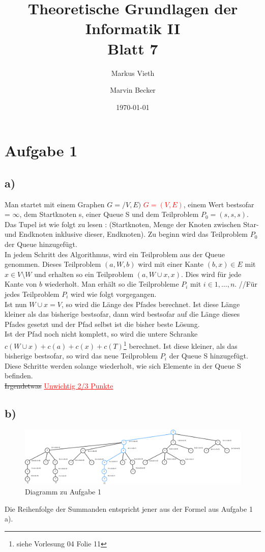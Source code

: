 \documentclass[a4paper,11pt,twoside]{article}
\title{Theoretische Grundlagen der Informatik II\\ Blatt 7}
\author{Markus Vieth \and Marvin Becker}
\date{\today}
\newcommand{\korr}[2]{\sout{#1} \textcolor{red}{\underline{#2}}}
\begin{document}
\maketitle
\cleardoublepage
\pagestyle{myheadings}

\section*{Aufgabe 1}
\subsection*{a)}
Man startet mit einem Graphen \korr{$G=/V,E)$}{$G=(V,E)$}, einem Wert \textrm{bestsofar} = $\infty$, dem Startknoten s, einer Queue S und dem Teilproblem $P_0 = (s,{s},s)$. Das Tupel ist wie folgt zu lesen : (Startknoten, Menge der Knoten zwischen Star- und Endknoten inklusive dieser, Endknoten).
Zu beginn wird das Teilproblem $P_0$ der Queue hinzugefügt.\\
In jedem Schritt des Algorithmus, wird ein Teilproblem aus der Queue genommen. Dieses Teilproblem $(a, W, b)$ wird mit einer Kante $(b, x)\in E $ mit $x\in V\setminus W$ und erhalten so ein Teilproblem $(a, W \cup {x}, x)$. Dies wird für jede Kante von $b$ wiederholt. Man erhält so die Teilprobleme $P_i$ mit $i\in {1,\ldots,n}$.
//Für jedes Teilproblem $P_i$ wird wie folgt vorgegangen.
\\Ist nun $W \cup {x} = V$, so wird die Länge des Pfades berechnet. Ist diese Länge kleiner als das bisherige \textrm{bestsofar}, dann wird \textrm{bestsofar} auf die Länge dieses Pfades gesetzt und der Pfad selbst ist die bisher beste Lösung.
\\Ist der Pfad noch nicht komplett, so wird die untere Schranke $c(W \cup {x})+c(a)+c(x)+c(T)$\footnote{siehe Vorlesung 04 Folie 11} berechnet. Ist diese kleiner, als das bisherige \textrm{bestsofar}, so wird das neue Teilproblem $P_i$ der Queue S hinzugefügt.\\
Diese Schritte werden solange wiederholt, wie sich Elemente in der Queue S befinden.\\
\korr{Irgendetwas}{Unwichtig 2/3 Punkte}
\subsection*{b)}
\begin{figure}[h]
	\hspace{-60pt}
\includegraphics[width=1.2\linewidth]{Baum}
\caption{Diagramm zu Aufgabe 1}
\label{fig:Baum}
\end{figure}
Die Reihenfolge der Summanden entspricht jener aus der Formel aus Aufgabe 1 a).
\end{document}
